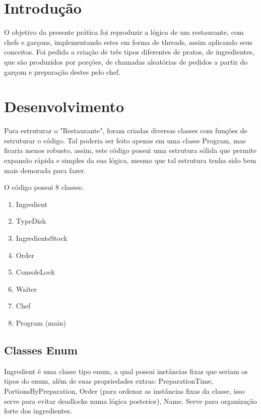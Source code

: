 \documentclass[
	12pt,				%
	oneside,			%
	a4paper,			%
	english,			%
	brazil,				%
	]{abntex2}
\begin{document}
\frenchspacing 

\imprimircapa

{
\ABNTEXchapterfont

\textual

\section{Introdução}

O objetivo da presente prática foi reproduzir a lógica de um restaurante, com chefs e garçons, implementando estes em forma de threads, assim aplicando seus conceitos. Foi pedida a criação de três tipos diferentes de pratos, de ingredientes, que são produzidos por porções, de chamadas aleatórias de pedidos a partir do garçom e preparação destes pelo chef.

\section{Desenvolvimento}

Para estruturar o "Restaurante", foram criadas diversas classes com funções de estruturar o código. Tal poderia ser feito apenas em uma classe Program, mas ficaria menos robusto, assim, este código possui uma estrutura sólida que permite expansão rápida e simples da sua lógica, mesmo que tal estrutura tenha sido bem mais demorada para fazer.

O código possui 8 classes:
\begin{enumerate}
    \item Ingredient
    \item TypeDish
    \item IngredientsStock
    \item Order
    \item ConsoleLock
    \item Waiter
    \item Chef
    \item Program (main)
\end{enumerate}

\subsection{Classes Enum}
Ingredient é uma classe tipo enum, a qual possui instâncias fixas que seriam os tipos do enum, além de suas propriedades extras: PreparationTime, PortionsByPreparation, Order (para ordenar as instâncias fixas da classe, isso serve para evitar deadlocks numa lógica posterior), Name. Serve para organização forte dos ingredientes.

}
\end{document}
